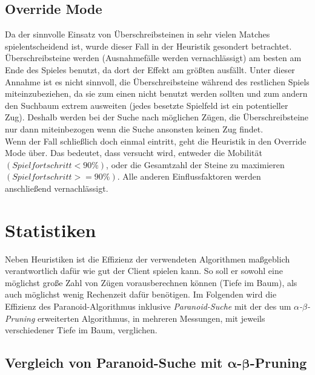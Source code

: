 \documentclass[12pt,a4paper,bibliography=totocnumbered,listof=totocnumbered,ngerman]{scrartcl}
\begin{document}
\subsection{Override Mode}
Da der sinnvolle Einsatz von Überschreibsteinen in sehr vielen Matches spielentscheidend ist, wurde dieser Fall in der Heuristik gesondert betrachtet. Überschreibsteine werden (Ausnahmefälle werden vernachlässigt) am besten am Ende des Spieles benutzt, da dort der Effekt am größten ausfällt. Unter dieser Annahme ist es nicht sinnvoll, die Überschreibsteine während des restlichen Spiels miteinzubeziehen, da sie zum einen nicht benutzt werden sollten und zum andern den Suchbaum extrem ausweiten (jedes besetzte Spielfeld ist ein potentieller Zug). Deshalb werden bei der Suche nach möglichen Zügen, die Überschreibsteine nur dann miteinbezogen wenn die Suche ansonsten keinen Zug findet.\\
Wenn der Fall schließlich doch einmal eintritt, geht die Heuristik in den Override Mode über. Das bedeutet, dass versucht wird, entweder die Mobilität $(Spielfortschritt < 90\%)$, oder die Gesamtzahl der Steine zu maximieren $(Spielfortschritt >= 90\%)$. Alle anderen Einflussfaktoren werden anschließend vernachlässigt.

	
	

\newpage
\section{Statistiken}
Neben Heuristiken ist die Effizienz der verwendeten Algorithmen maßgeblich verantwortlich dafür wie gut der Client spielen kann. So soll er sowohl eine möglichst große Zahl von Zügen vorausberechnen können (Tiefe im Baum), als auch möglichst wenig Rechenzeit dafür benötigen. Im Folgenden wird die Effizienz des Paranoid-Algorithmus inklusive \emph{Paranoid-Suche} mit der des um \emph{$\alpha$-$\beta$-Pruning} erweiterten Algorithmus, in mehreren Messungen, mit jeweils verschiedener Tiefe im Baum, verglichen.


\subsection{Vergleich von Paranoid-Suche mit $\boldsymbol{\alpha}$-$\boldsymbol{\beta}$-Pruning}
\end{document}
